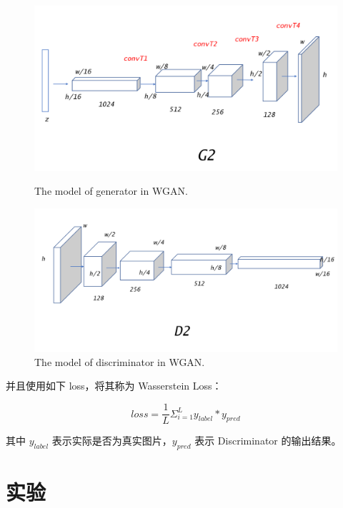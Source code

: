 \documentclass{article}
\begin{document}
\begin{CJK*}{UTF8}{gbsn}
	\begin{figure}[htbp]
		\begin{minipage}{0.5\linewidth}
			\centering\includegraphics[scale=0.13]{res/WGAN_generator.png}
			\caption{The model of generator in WGAN.}
		\end{minipage}
		\begin{minipage}{0.5\linewidth}
			\centering\includegraphics[scale=0.13]{res/WGAN_discriminator.png}
			\caption{The model of discriminator in WGAN.}
		\end{minipage}
	\end{figure}
  
	并且使用如下 loss，将其称为 Wasserstein Loss：
	
	\begin{equation}
		loss = \frac{1}{L} \Sigma_{i=1}^L y_{label} * y_{pred} 
	\end{equation}
	
	其中 $y_{label}$ 表示实际是否为真实图片，$y_{pred}$ 表示 Discriminator 的输出结果。

\section{实验}


\end{CJK*}
\end{document}
